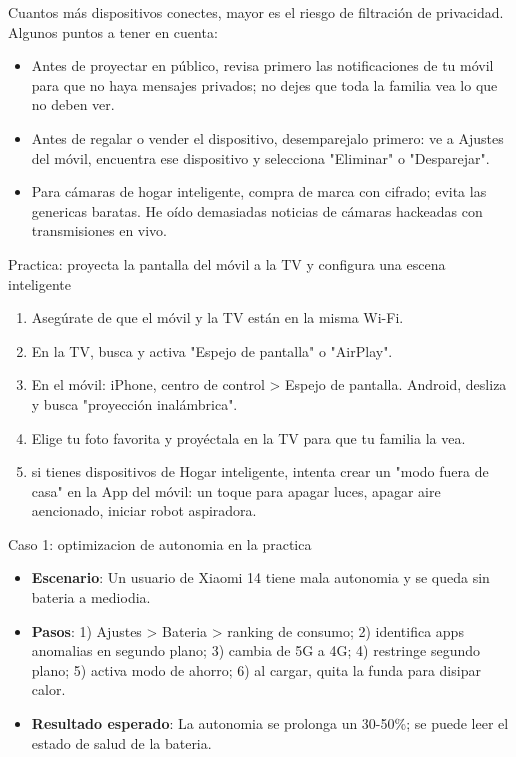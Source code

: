 
Cuantos más dispositivos conectes, mayor es el riesgo de filtración de privacidad. Algunos puntos a tener en cuenta:

\begin{itemize}
  \item Antes de proyectar en público, revisa primero las notificaciones de tu móvil para que no haya mensajes privados; no dejes que toda la familia vea lo que no deben ver.
  \item Antes de regalar o vender el dispositivo, desemparejalo primero: ve a Ajustes del móvil, encuentra ese dispositivo y selecciona "Eliminar" o "Desparejar".
  \item Para cámaras de hogar inteligente, compra de marca con cifrado; evita las genericas baratas. He oído demasiadas noticias de cámaras hackeadas con transmisiones en vivo.
\end{itemize}

\begin{tcbpractice}{Practica: proyecta la pantalla del móvil a la TV y configura una escena inteligente}
\begin{enumerate}
  \item Asegúrate de que el móvil y la TV están en la misma Wi-Fi.
  \item En la TV, busca y activa "Espejo de pantalla" o "AirPlay".
  \item En el móvil: iPhone, centro de control > Espejo de pantalla. Android, desliza y busca "proyección inalámbrica".
  \item Elige tu foto favorita y proyéctala en la TV para que tu familia la vea.
  \item si tienes dispositivos de Hogar inteligente, intenta crear un "modo fuera de casa" en la App del móvil: un toque para apagar luces, apagar aire aencionado, iniciar robot aspiradora.
\end{enumerate}

\end{tcbpractice}

\begin{tcbinfo}{Caso 1: optimizacion de autonomia en la practica}
\begin{itemize}
  \item \textbf{Escenario}: Un usuario de Xiaomi 14 tiene mala autonomia y se queda sin bateria a mediodia.
  \item \textbf{Pasos}: 1) Ajustes > Bateria > ranking de consumo; 2) identifica apps anomalias en segundo plano; 3) cambia de 5G a 4G; 4) restringe segundo plano; 5) activa modo de ahorro; 6) al cargar, quita la funda para disipar calor.
  \item \textbf{Resultado esperado}: La autonomia se prolonga un 30-50\%; se puede leer el estado de salud de la bateria.
\end{itemize}

\end{tcbinfo}
